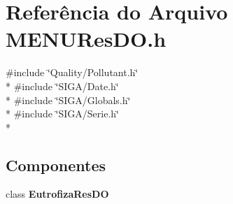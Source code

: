 \section{Referência do Arquivo M\+E\+N\+U\+Res\+D\+O.\+h}
\label{_m_e_n_u_res_d_o_8h}
{\ttfamily \#include \char`\"{}Quality/\+Pollutant.\+h\char`\"{}}\\*
{\ttfamily \#include \char`\"{}S\+I\+G\+A/\+Date.\+h\char`\"{}}\\*
{\ttfamily \#include \char`\"{}S\+I\+G\+A/\+Globals.\+h\char`\"{}}\\*
{\ttfamily \#include \char`\"{}S\+I\+G\+A/\+Serie.\+h\char`\"{}}\\*
\subsection*{Componentes}
\begin{DoxyCompactItemize}
\item 
class {\bf Eutrofiza\+Res\+DO}
\end{DoxyCompactItemize}
